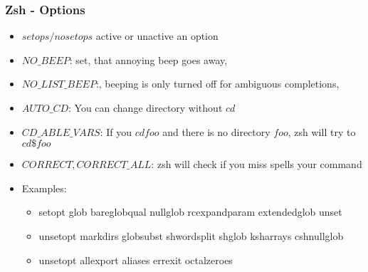 \subsubsection{Zsh - Options}
\begin{frame}[fragile]{\subsubsecname}
  \begin{itemize}
    \item $setops/nosetops$ active or unactive an option
    \item $NO\_BEEP$: set, that annoying beep goes away,
    \item $NO\_LIST\_BEEP$:, beeping is only turned off for ambiguous completions,
    \item $AUTO\_CD$: You can change directory without $cd$
    \item $CD\_ABLE\_VARS$: If you $cd foo$ and there is no directory $foo$, zsh will try to $cd  \$foo$
    \item $CORRECT, CORRECT\_ALL$: zsh will check if you miss spells your command
    \item Examples:
    \begin{itemize}
    \item setopt glob bareglobqual nullglob rcexpandparam extendedglob unset
    \item unsetopt markdirs globsubst shwordsplit shglob ksharrays cshnullglob
    \item unsetopt allexport aliases errexit octalzeroes
    \end{itemize}
  \end{itemize}
\end{frame}

